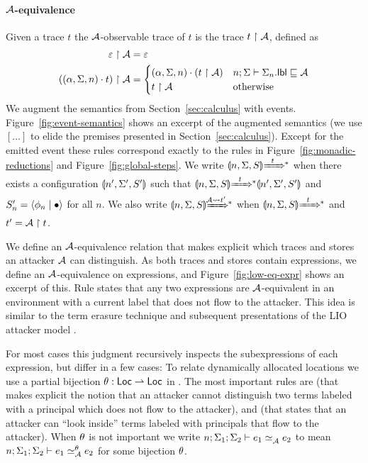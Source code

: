 \paragraph{$\mathcal{A}$-equivalence}
Given a trace $t$ the $\mathcal{A}$-observable trace of $t$ is the trace $t \upharpoonright \mathcal{A}$, defined as
\begin{align*}
\varepsilon \upharpoonright \mathcal{A} &= \varepsilon\\
((\alpha, \Sigma, n) \cdot t) \upharpoonright \mathcal{A} &=
\begin{cases}
(\alpha, \Sigma, n) \cdot (t \upharpoonright \mathcal{A}) & n; \Sigma \vdash \Sigma_n.\mathsf{lbl} \sqsubseteq \mathcal{A} \\
t \upharpoonright \mathcal{A} & \text{otherwise}
\end{cases}
\end{align*}
We augment the semantics from Section~\ref{sec:calculus} with events. Figure~\ref{fig:event-semantics} shows an excerpt of the augmented semantics (we use $[\ldots]$ to elide the premises presented in Section~\ref{sec:calculus}). Except for the emitted event these rules correspond exactly to the rules in Figure~\ref{fig:monadic-reductions} and Figure~\ref{fig:global-steps}. We write $\gconfig{n}{\env}{S} \gstepstos[][t]$ when there exists a configuration $\llparenthesis n', \Sigma', S' \rrparenthesis$ such that $\gconfig{n}{\env}{S} \gstepstos[][t] \gconfig{n'}{\env'}{S'}$ and $S'_n = \langle \phi_n \mid \bullet \rangle$ for all $n$. We also write $\gconfig{n}{\env}{S} \gstepstos[][\Attacker \filtertrace t']$ when $\gconfig{n}{\env}{S} \gstepstos[][t]$ and $t' = \mathcal{A} \upharpoonright t$.

We define an $\mathcal{A}$-equivalence relation that makes explicit which traces and stores an attacker $\mathcal{A}$ can distinguish. As both traces and stores contain expressions, we define an $\mathcal{A}$-equivalence on expressions, and Figure~\ref{fig:low-eq-expr} shows an excerpt of this. Rule  states that any two expressions are $\mathcal{A}$-equivalent in an environment with a current label that does not flow to the attacker. This idea is similar to the term erasure technique \cite{SRMMlio} and subsequent presentations of the LIO attacker model \cite{Stefan:2012:ACT:2364527.2364557, 10.1007/978-3-642-40203-6_40, 10.1007/978-3-319-24858-5_13}.

For most cases this judgment recursively inspects the subexpressions of each expression, but differ in a few cases: To relate dynamically allocated locations we use a partial bijection \cite{Banerjee:2002:SIF:794201.795164, Rajani2018} $\theta: \mathsf{Loc} \rightharpoonup \mathsf{Loc}$ in . The most important rules are  (that makes explicit the notion that an attacker cannot distinguish two terms labeled with a principal which does not flow to the attacker), and  (that states that an attacker can ``look inside'' terms labeled with principals that flow to the attacker). When $\theta$ is not important we write $\loweq{n; \env_1; \env_2}{\Attacker}{\expr_1}{\expr_2}$ to mean $\loweq{n; \env_1; \env_2}{\Attacker}[\bijection]{\expr_1}{\expr_2}$ for some bijection $\theta$.

